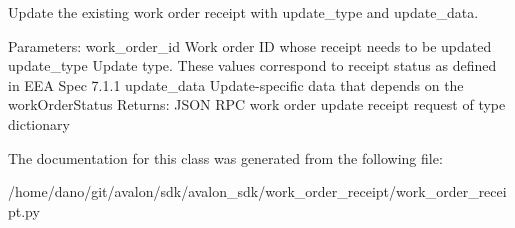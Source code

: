 \begin{DoxyVerb}Update the existing work order receipt with
update_type and update_data.

Parameters:
work_order_id Work order ID whose receipt
      needs to be updated
update_type   Update type. These values correspond to
      receipt status as defined in EEA Spec 7.1.1
update_data   Update-specific data that depends on
      the workOrderStatus
Returns:
JSON RPC work order update receipt request of type dictionary
\end{DoxyVerb}
 

The documentation for this class was generated from the following file\+:\begin{DoxyCompactItemize}
\item 
/home/dano/git/avalon/sdk/avalon\+\_\+sdk/work\+\_\+order\+\_\+receipt/work\+\_\+order\+\_\+receipt.\+py\end{DoxyCompactItemize}
